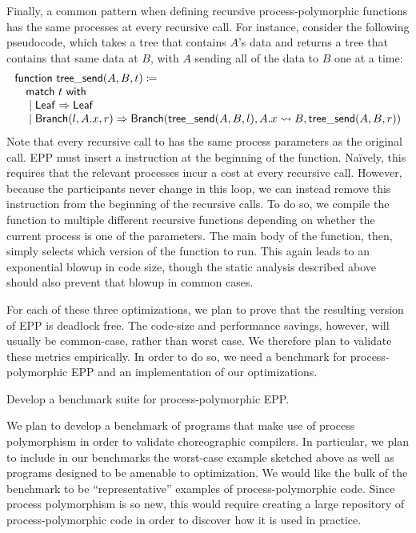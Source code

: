 Finally, a common pattern when defining recursive process-polymorphic functions has the same processes at every recursive call.
For instance, consider the following pseudocode, which takes a tree that contains $A$'s data and returns a tree that contains that same data at $B$, with $A$ sending all of the data to $B$ one at a time:
$$
\begin{array}{l}
  \programfont{function}~\programfont{tree\_send} (A, B, t) \coloneqq \\
  \quad\begin{array}[t]{@{}l@{}}
    \programfont{match}~t~\programfont{with}\\
    {} \mid \programfont{Leaf} \Rightarrow \programfont{Leaf}\\
    {} \mid \programfont{Branch}(l, A.x, r) \Rightarrow \programfont{Branch}(\programfont{tree\_send}(A, B, l), A.x \rightsquigarrow B, \programfont{tree\_send}(A,B,r))
  \end{array}
\end{array}
$$
Note that every recursive call to  has the same process parameters as the original call.
EPP must insert a \AmIN instruction at the beginning of the function.
Na\"ively, this requires that the relevant processes incur a cost at every recursive call.
However, because the participants never change in this loop, we can instead remove this \AmIN instruction from the beginning of the recursive calls.
To do so, we compile the function to multiple different recursive functions depending on whether the current process is one of the parameters.
The main body of the function, then, simply selects which version of the function to run.
This again leads to an exponential blowup in code size, though the static analysis described above should also prevent that blowup in common cases.

For each of these three optimizations, we plan to prove that the resulting version of EPP is deadlock free.
The code-size and performance savings, however, will usually be common-case, rather than worst case.
We therefore plan to validate these metrics empirically.
In order to do so, we need a benchmark for process-polymorphic EPP and an implementation of our optimizations.

\begin{goal}
  Develop a benchmark suite for process-polymorphic EPP.
\end{goal}

We plan to develop a benchmark of programs that make use of process polymorphism in order to validate choreographic compilers.
In particular, we plan to include in our benchmarks the worst-case example sketched above as well as programs designed to be amenable to optimization.
We would like the bulk of the benchmark to be ``representative'' examples of process-polymorphic code.
Since process polymorphism is so new, this would require creating a large repository of process-polymorphic code in order to discover how it is used in practice.

